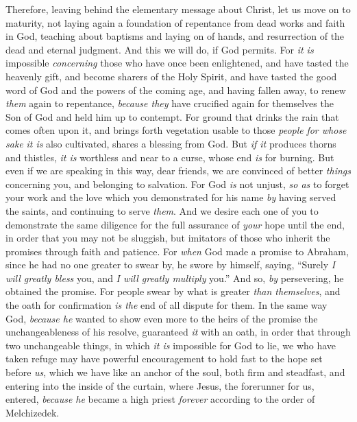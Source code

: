 \begin{biblechapter} %
 Therefore, leaving behind the elementary message about Christ, let us move on to maturity, not laying again a foundation of repentance from dead works and faith in God,
\verse teaching about baptisms and laying on of hands, and resurrection of the dead and eternal judgment.
\verse And this we will do, if God permits.
\verse For \textit{it is} impossible \textit{concerning} those who have once been enlightened, and have tasted the heavenly gift, and become sharers of the Holy Spirit,
\verse and have tasted the good word of God and the powers of the coming age,
\verse and having fallen away, to renew \textit{them} again to repentance, \textit{because they} have crucified again for themselves the Son of God and held him up to contempt.
\verse For ground that drinks the rain that comes often upon it, and brings forth vegetation usable to those \textit{people} \textit{for whose sake} \textit{it is} also cultivated, shares a blessing from God.
\verse But \textit{if it} produces thorns and thistles, \textit{it is} worthless and near to a curse, whose end \textit{is} for burning.
\verse But even if we are speaking in this way, dear friends, we are convinced of better \textit{things} concerning you, and belonging to salvation.
\verse For God \textit{is} not unjust, \textit{so as} to forget your work and the love which you demonstrated for his name \textit{by} having served the saints, and continuing to serve \textit{them}.
\verse And we desire each one of you to demonstrate the same diligence for the full assurance of \textit{your} hope until the end,
\verse in order that you may not be sluggish, but imitators of those who inherit the promises through faith and patience.
 For \textit{when} God made a promise to Abraham, since he had no one greater to swear by, he swore by himself,
\verse saying, “Surely \textit{I will greatly bless} you, and \textit{I will greatly multiply} you.”
\verse And so, \textit{by} persevering, he obtained the promise.
\verse For people swear by what is greater \textit{than themselves}, and the oath for confirmation \textit{is the} end of all dispute for them.
\verse In the same way God, \textit{because he} wanted to show even more to the heirs of the promise the unchangeableness of his resolve, guaranteed \textit{it} with an oath,
\verse in order that through two unchangeable things, in which \textit{it is} impossible for God to lie, we who have taken refuge may have powerful encouragement to hold fast to the hope set before \textit{us},
\verse which we have like an anchor of the soul, both firm and steadfast, and entering into the inside of the curtain,
\verse where Jesus, the forerunner for us, entered, \textit{because he} became a high priest \textit{forever} according to the order of Melchizedek.
\end{biblechapter}

